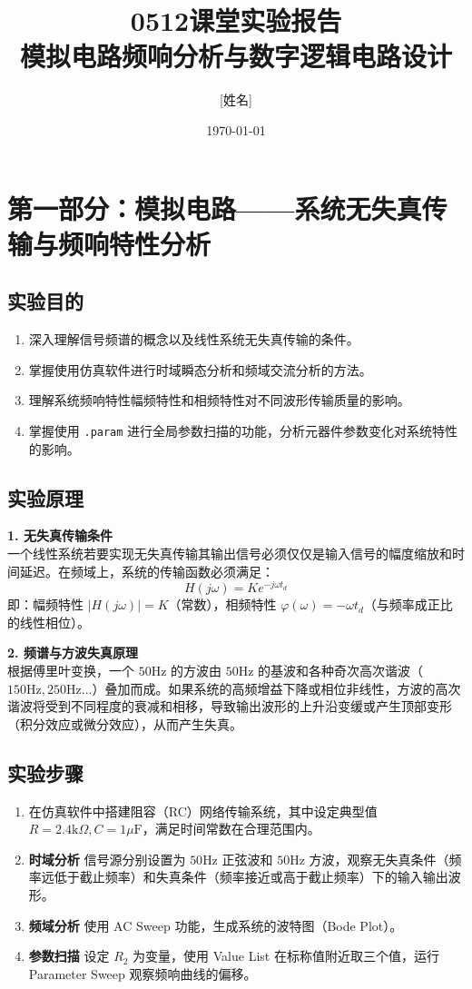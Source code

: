 \documentclass[12pt, a4paper]{article}
\title{\textbf{0512课堂实验报告}\\ \large{模拟电路频响分析与数字逻辑电路设计}}
\author{[姓名] \quad [学号]}
\date{\today}
\begin{document}
\maketitle

\section{第一部分：模拟电路——系统无失真传输与频响特性分析}

\subsection{实验目的}
\begin{enumerate}
    \item 深入理解信号频谱的概念以及线性系统无失真传输的条件。
    \item 掌握使用仿真软件进行时域瞬态分析和频域交流分析的方法。
    \item 理解系统频响特性幅频特性和相频特性对不同波形传输质量的影响。
    \item 掌握使用 \texttt{.param} 进行全局参数扫描的功能，分析元器件参数变化对系统特性的影响。
\end{enumerate}

\subsection{实验原理}
\textbf{1. 无失真传输条件} \\
一个线性系统若要实现无失真传输其输出信号必须仅仅是输入信号的幅度缩放和时间延迟。在频域上，系统的传输函数必须满足：
$$H(j\omega) = K e^{-j\omega t_d}$$
即：幅频特性 $|H(j\omega)| = K$（常数），相频特性 $\varphi(\omega) = -\omega t_d$（与频率成正比的线性相位）。

\textbf{2. 频谱与方波失真原理} \\
根据傅里叶变换，一个 $50\text{Hz}$ 的方波由 $50\text{Hz}$ 的基波和各种奇次高次谐波（$150\text{Hz}, 250\text{Hz}\dots$）叠加而成。如果系统的高频增益下降或相位非线性，方波的高次谐波将受到不同程度的衰减和相移，导致输出波形的上升沿变缓或产生顶部变形（积分效应或微分效应），从而产生失真。

\subsection{实验步骤}
\begin{enumerate}
    \item 在仿真软件中搭建阻容（RC）网络传输系统，其中设定典型值 $R=2.4\text{k}\Omega, C=1\mu\text{F}$，满足时间常数在合理范围内。
    \item \textbf{时域分析} 信号源分别设置为 $50\text{Hz}$ 正弦波和 $50\text{Hz}$ 方波，观察无失真条件（频率远低于截止频率）和失真条件（频率接近或高于截止频率）下的输入输出波形。
    \item \textbf{频域分析} 使用 AC Sweep 功能，生成系统的波特图（Bode Plot）。
    \item \textbf{参数扫描} 设定 $R_2$ 为变量，使用 Value List 在标称值附近取三个值，运行 Parameter Sweep 观察频响曲线的偏移。
\end{enumerate}
\end{document}
